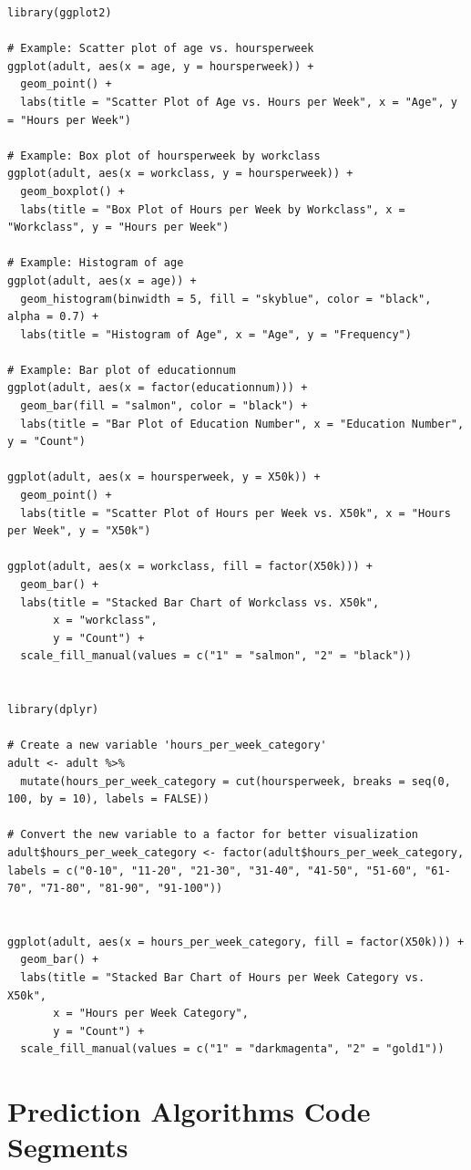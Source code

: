\documentclass{article}
\begin{document}
\begin{verbatim}
library(ggplot2)

# Example: Scatter plot of age vs. hoursperweek
ggplot(adult, aes(x = age, y = hoursperweek)) +
  geom_point() +
  labs(title = "Scatter Plot of Age vs. Hours per Week", x = "Age", y = "Hours per Week")

# Example: Box plot of hoursperweek by workclass
ggplot(adult, aes(x = workclass, y = hoursperweek)) +
  geom_boxplot() +
  labs(title = "Box Plot of Hours per Week by Workclass", x = "Workclass", y = "Hours per Week")

# Example: Histogram of age
ggplot(adult, aes(x = age)) +
  geom_histogram(binwidth = 5, fill = "skyblue", color = "black", alpha = 0.7) +
  labs(title = "Histogram of Age", x = "Age", y = "Frequency")

# Example: Bar plot of educationnum
ggplot(adult, aes(x = factor(educationnum))) +
  geom_bar(fill = "salmon", color = "black") +
  labs(title = "Bar Plot of Education Number", x = "Education Number", y = "Count")

ggplot(adult, aes(x = hoursperweek, y = X50k)) +
  geom_point() +
  labs(title = "Scatter Plot of Hours per Week vs. X50k", x = "Hours per Week", y = "X50k")

ggplot(adult, aes(x = workclass, fill = factor(X50k))) +
  geom_bar() +
  labs(title = "Stacked Bar Chart of Workclass vs. X50k",
       x = "workclass",
       y = "Count") +
  scale_fill_manual(values = c("1" = "salmon", "2" = "black"))


library(dplyr)

# Create a new variable 'hours_per_week_category'
adult <- adult %>%
  mutate(hours_per_week_category = cut(hoursperweek, breaks = seq(0, 100, by = 10), labels = FALSE))

# Convert the new variable to a factor for better visualization
adult$hours_per_week_category <- factor(adult$hours_per_week_category, labels = c("0-10", "11-20", "21-30", "31-40", "41-50", "51-60", "61-70", "71-80", "81-90", "91-100"))


ggplot(adult, aes(x = hours_per_week_category, fill = factor(X50k))) +
  geom_bar() +
  labs(title = "Stacked Bar Chart of Hours per Week Category vs. X50k",
       x = "Hours per Week Category",
       y = "Count") +
  scale_fill_manual(values = c("1" = "darkmagenta", "2" = "gold1"))

\end{verbatim}

\section{Prediction Algorithms Code Segments}
\end{document}
